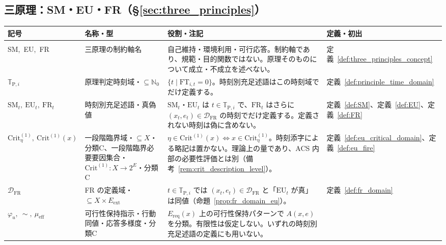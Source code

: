 \subsection{三原理：SM・EU・FR（\S\ref{sec:three_principles}）}
\label{app:symbols_s3}

\begingroup
\small
\setlength{\tabcolsep}{4pt}
\renewcommand{\arraystretch}{1.18}
\begin{longtable}{p{3.0cm} p{3.0cm} p{6.6cm} p{2.0cm}}
\hline
\textbf{記号} & \textbf{名称・型} & \textbf{役割・注記} & \textbf{定義・初出} \\
\hline
\endhead
\hline
\endfoot
\multicolumn{4}{l}{\textbf{三原理と時刻別充足述語}} \\[2pt]
SM,\ EU,\ FR & 三原理の制約軸名 &
自己維持・環境利用・可行応答。制約軸であり、規範・目的関数ではない。原理そのものについて成立・不成立を述べない。 &
定義~\ref{def:three_principles_concept} \\[3pt]
$\mathbb{T}_{\mathrm{P},i}$ & 原理判定時刻域・$\subseteq\mathbb{N}_0$ &
$\{t\mid\mathrm{FT}_{i,t}=0\}$。時刻別充足述語はこの時刻域でだけ定義する。 &
定義~\ref{def:principle_time_domain} \\[3pt]
$\mathrm{SM}_t,\ \mathrm{EU}_t,\ \mathrm{FR}_t$ & 時刻別充足述語・真偽値 &
$\mathrm{SM}_t$・$\mathrm{EU}_t$ は $t\in\mathbb{T}_{\mathrm{P},i}$ で、$\mathrm{FR}_t$ はさらに $(x_t,e_t)\in\mathcal{D}_{\mathrm{FR}}$ の時刻でだけ定義する。定義されない時刻は偽に含めない。 &
定義~\ref{def:SM}、定義~\ref{def:EU}、定義~\ref{def:FR} \\[3pt]
$\mathrm{Crit}^{(1)}_\eta,\ \mathrm{Crit}^{(1)}(x)$ & 一段階臨界域・$\subseteq X$・分類C、一段階臨界必要要因集合・$\mathrm{Crit}^{(1)}:X\to2^E$・分類C &
$\eta\in\mathrm{Crit}^{(1)}(x)\iff x\in\mathrm{Crit}^{(1)}_\eta$。時刻添字による略記は置かない。理論上の量であり、ACS 内部の必要性評価とは別（備考~\ref{rem:crit_description_level}）。 &
定義~\ref{def:eu_critical_domain}、定義~\ref{def:eu_fire} \\[3pt]
$\mathcal{D}_{\mathrm{FR}}$ & FR の定義域・$\subseteq X\times E_{\mathrm{ext}}$ &
$t\in\mathbb{T}_{\mathrm{P},i}$ では $(x_t,e_t)\in\mathcal{D}_{\mathrm{FR}}$ と「$\mathrm{EU}_t$ が真」は同値（命題~\ref{prop:fr_domain_eu}）。 &
定義~\ref{def:fr_domain} \\[3pt]
$\varphi_u,\ \sim,\ \mu_{\mathrm{eff}}$ & 可行性保持指示・行動同値・応答多様度・分類C &
$E_{\mathrm{req}}(x)$ 上の可行性保持パターンで $A(x,e)$ を分類。有限性は仮定しない。いずれの時刻別充足述語の定義にも用いない。 &

\end{longtable}
